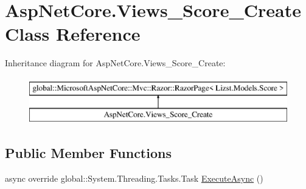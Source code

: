 \hypertarget{class_asp_net_core_1_1_views___score___create}{}\section{Asp\+Net\+Core.\+Views\+\_\+\+Score\+\_\+\+Create Class Reference}
\label{class_asp_net_core_1_1_views___score___create}
Inheritance diagram for Asp\+Net\+Core.\+Views\+\_\+\+Score\+\_\+\+Create\+:\begin{figure}[H]
\begin{center}
\leavevmode
\includegraphics[height=2.000000cm]{class_asp_net_core_1_1_views___score___create}
\end{center}
\end{figure}
\subsection*{Public Member Functions}
\begin{DoxyCompactItemize}
\item 
async override global\+::\+System.\+Threading.\+Tasks.\+Task \mbox{\hyperlink{class_asp_net_core_1_1_views___score___create_a4618b42aeeb2ef16e5d7650eecab661c}{Execute\+Async}} ()
\end{DoxyCompactItemize}
